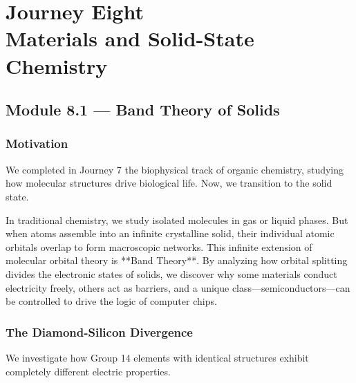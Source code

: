 \documentclass[12pt, a4paper]{book}
\begin{document}
\setcounter{chapter}{7}
\chapter[Journey 8 --- Materials and Solid-State Chemistry]
        {Journey Eight\\[8pt]
         \textcolor{ModuleColor}{\large Materials and Solid-State Chemistry}}
\setcounter{section}{0}

\section{Module 8.1 --- Band Theory of Solids}
\label{sec:mod8.1}

\subsection*{Motivation}

We completed in Journey 7 the biophysical track of organic chemistry, studying how molecular structures drive biological life.
Now, we transition to the solid state.

In traditional chemistry, we study isolated molecules in gas or liquid phases.
But when atoms assemble into an infinite crystalline solid, their individual atomic orbitals overlap to form macroscopic networks.
This infinite extension of molecular orbital theory is **Band Theory**.
By analyzing how orbital splitting divides the electronic states of solids, we discover why some materials conduct electricity freely, others act as barriers, and a unique class—semiconductors—can be controlled to drive the logic of computer chips.

\subsection{The Diamond-Silicon Divergence}

We investigate how Group 14 elements with identical structures exhibit completely different electric properties.
\end{document}
